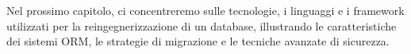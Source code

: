 Nel prossimo capitolo, ci concentreremo sulle tecnologie, i linguaggi e i framework utilizzati per la reingegnerizzazione di un database, illustrando le caratteristiche dei sistemi ORM, le strategie di migrazione e le tecniche avanzate di sicurezza.



%

